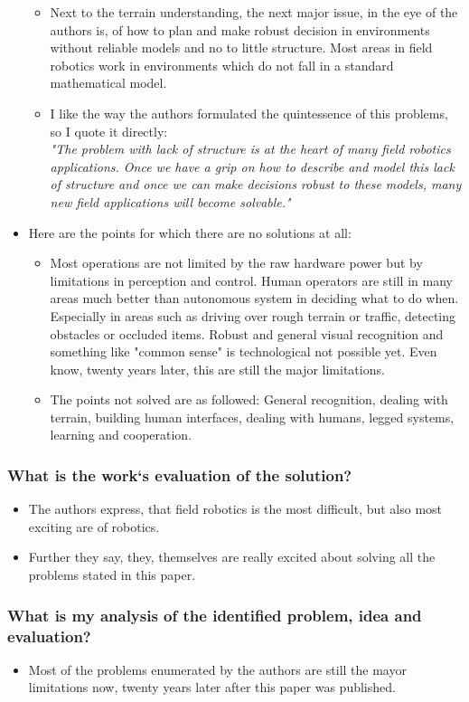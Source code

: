 \begin{itemize}
\begin{itemize}
        \item Next to the terrain understanding, the next major issue, in the eye of the authors is, of how to plan and make robust decision in environments without reliable models and no to little structure. Most areas in field robotics work in environments which do not fall in a standard mathematical model.
        \item I like the way the authors formulated the quintessence of this problems, so I quote it directly: \\
         \emph{"The problem with lack of structure is at the heart of many field robotics applications. Once we have a grip on how to describe and model this lack of structure and once we can make decisions robust to these models, many new field applications will become solvable."}
    \end{itemize}
    \item Here are the points for which there are no solutions at all: \ \begin{itemize}
        \item Most operations are not limited by the raw hardware power but by limitations in perception and control. Human operators are still in many areas much better than autonomous system in deciding what to do when. Especially in areas such as driving over rough terrain or traffic, detecting obstacles or occluded items. Robust and general visual recognition and something like "common sense" is technological not possible yet. Even know, twenty years later, this are still the major limitations.
        \item The points not solved are as followed: General recognition, dealing with terrain, building human interfaces, dealing with humans, legged systems, learning and cooperation.
    \end{itemize}
\end{itemize}
\subsubsection*{What is the work`s evaluation of the solution?}
\begin{itemize}
    \item The authors express, that field robotics is the most difficult, but also most exciting are of robotics. 
    \item Further they say, they, themselves are really excited about solving all the problems stated in this paper.
\end{itemize}
\subsubsection*{What is my analysis of the identified problem, idea and evaluation?}
\begin{itemize}
    \item Most of the problems enumerated by the authors are still the mayor limitations now, twenty years later after this paper was published. 
\end{itemize}
